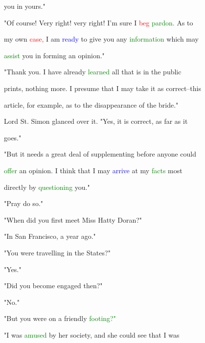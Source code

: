  you in yours."



 "Of course! Very right! very right! I'm sure I \textcolor{red}{beg} \textcolor{green}{pardon.} As to

 my own \textcolor{red}{case,} I am \textcolor{blue}{ready} to give you any \textcolor{green}{information} which may

 \textcolor{green}{assist} you in forming an opinion."



 "Thank you. I have already \textcolor{green}{learned} all that is in the \textcolor{BurntOrange}{public}

 prints, nothing more. I presume that I may take it as correct--this

 article, for example, as to the disappearance of the \textcolor{BurntOrange}{bride."}



 \textcolor{BurntOrange}{Lord} St. Simon glanced over it. "Yes, it is correct, as far as it

 goes."



 "But it needs a great \textcolor{BurntOrange}{deal} of supplementing before anyone could

 \textcolor{green}{offer} an opinion. I think that I may \textcolor{blue}{arrive} at my \textcolor{green}{facts} most

 directly by \textcolor{green}{questioning} you."



 \textcolor{BurntOrange}{"Pray} do so."



 "When did you first meet Miss Hatty Doran?"



 "In San Francisco, a year ago."



 "You were travelling in the States?"



 "Yes."



 "Did you become engaged then?"



 "No."



 "But you were on a \textcolor{BurntOrange}{friendly} \textcolor{green}{footing?"}



 "I was \textcolor{green}{amused} by her society, and she could see that I was

